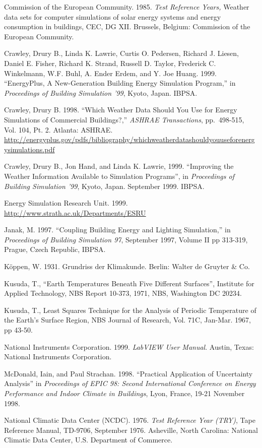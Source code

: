 Commission of the European Community. 1985. \emph{Test Reference Years,} Weather data sets for computer simulations of solar energy systems and energy consumption in buildings, CEC, DG XII. Brussels, Belgium: Commission of the European Community.

Crawley, Drury B., Linda K. Lawrie, Curtis O. Pedersen, Richard J. Liesen, Daniel E. Fisher, Richard K. Strand, Russell D. Taylor, Frederick C. Winkelmann, W.F. Buhl, A. Ender Erdem, and Y. Joe Huang. 1999. ``EnergyPlus, A New-Generation Building Energy Simulation Program,'' in \emph{Proceedings of Building Simulation '99}, Kyoto, Japan. IBPSA.

Crawley, Drury B. 1998. ``Which Weather Data Should You Use for Energy Simulations of Commercial Buildings?,'' \emph{ASHRAE Transactions}, pp.~498-515, Vol. 104, Pt. 2. Atlanta: ASHRAE. \url{http://energyplus.gov/pdfs/bibliography/whichweatherdatashouldyouuseforenergysimulations.pdf}

Crawley, Drury B., Jon Hand, and Linda K. Lawrie, 1999. ``Improving the Weather Information Available to Simulation Programs'', in \emph{Proceedings of Building Simulation '99}, Kyoto, Japan. September 1999. IBPSA.

Energy Simulation Research Unit. 1999. \url{http://www.strath.ac.uk/Departments/ESRU}

Janak, M. 1997. ``Coupling Building Energy and Lighting Simulation,'' in \emph{Proceedings of Building Simulation 97}, September 1997, Volume II pp 313-319, Prague, Czech Republic, IBPSA.

Köppen, W. 1931. Grundriss der Klimakunde. Berlin: Walter de Gruyter \& Co.

Kusuda, T., ``Earth Temperatures Beneath Five Different Surfaces'', Institute for Applied Technology, NBS Report 10-373, 1971, NBS, Washington DC 20234.

Kusuda, T., Least Squares Technique for the Analysis of Periodic Temperature of the Earth's Surface Region, NBS Journal of Research, Vol. 71C, Jan-Mar. 1967, pp 43-50.

National Instruments Corporation. 1999. \emph{LabVIEW User Manual}. Austin, Texas: National Instruments Corporation.

McDonald, Iain, and Paul Strachan. 1998. ``Practical Application of Uncertainty Analysis'' in \emph{Proceedings of EPIC 98: Second International Conference on Energy Performance and Indoor Climate in Buildings}, Lyon, France, 19-21 November 1998.

National Climatic Data Center (NCDC). 1976. \emph{Test Reference Year (TRY)}, Tape Reference Manual, TD-9706, September 1976. Asheville, North Carolina: National Climatic Data Center, U.S. Department of Commerce.

